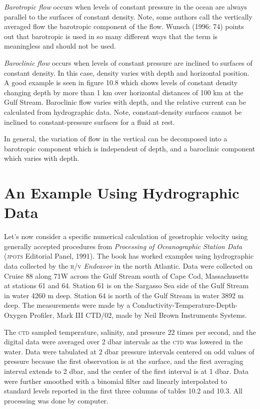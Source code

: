 \textit{Barotropic flow} occurs when
levels of constant pressure in the ocean are always parallel to the
surfaces of constant density. Note, some authors call the vertically
averaged flow the barotropic component of the flow.  Wunsch (1996: 74)
points out that barotropic is used in so many different ways that the
term is meaningless and should not be used.

\textit{Baroclinic flow} occurs when
levels of constant pressure are inclined to surfaces of constant
density. In this case, density varies with depth and horizontal
position. A good example is seen in figure 10.8 which shows levels of
constant density changing depth by more than 1 km over horizontal
distances of 100 km at the Gulf Stream. Baroclinic flow varies with depth, and the relative
current can be calculated from hydrographic data. Note, constant-density surfaces
cannot be inclined to constant-pressure surfaces for a fluid at rest.

In general, the variation of flow in the vertical can be decomposed
into a barotropic component which is independent of depth, and a
baroclinic component which varies with depth.

\section{An Example Using Hydrographic Data} Let's now consider a specific
numerical
calculation of geostrophic velocity using generally accepted
procedures from \textit{Processing of Oceanographic Station Data}
(\textsc{jpots} Editorial Panel, 1991). The book has worked examples
using hydrographic data
collected by the \textsc{r/v} \textit{Endeavor} in the north
Atlantic. Data were collected on Cruise 88 along 71\degrees W across
the Gulf Stream south of Cape
Cod, Massachusetts at stations 61 and 64. Station 61 is on the
Sargasso Sea side of the Gulf Stream in water 4260 m deep. Station 64
is north of the Gulf Stream in water 3892 m deep. The measurements
were made by a Conductivity-Temp\-erature-Depth-Oxygen Profiler, Mark
III CTD/02, made by Neil Brown Ins\-truments Systems.

The \textsc{ctd} sampled temperature, salinity, and pressure 22 times
per second, and the digital data were averaged over 2 dbar intervals
as the \textsc{ctd} was lowered in the water. Data were tabulated at 2
dbar pressure intervals centered on odd values of pressure because the
first observation is at the surface, and the first averaging interval
extends to 2 dbar, and the center of the first interval is at 1
dbar. Data were further smoothed with a binomial filter and linearly
interpolated to standard levels reported in the first three columns of
tables 10.2 and 10.3. All processing was done by computer.

